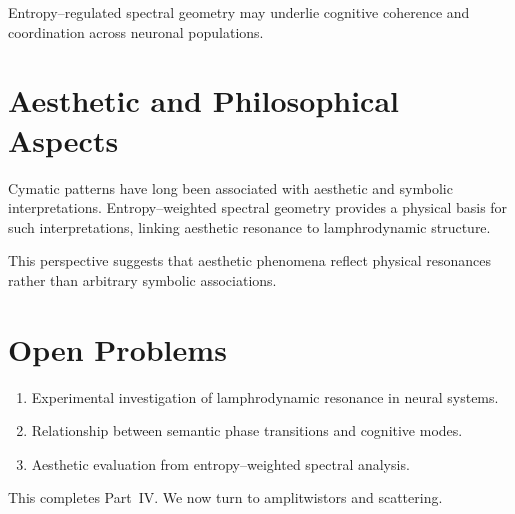 \begin{remark}
Entropy--regulated spectral geometry may underlie cognitive coherence
and coordination across neuronal populations.
\end{remark}


\section{Aesthetic and Philosophical Aspects}

Cymatic patterns have long been associated with aesthetic and symbolic
interpretations. Entropy--weighted spectral geometry provides a physical
basis for such interpretations, linking aesthetic resonance to
lamphrodynamic structure.

\begin{remark}
This perspective suggests that aesthetic phenomena reflect physical
resonances rather than arbitrary symbolic associations.
\end{remark}


\section{Open Problems}

\begin{enumerate}
\item Experimental investigation of lamphrodynamic resonance in neural
systems.
\item Relationship between semantic phase transitions and cognitive
modes.
\item Aesthetic evaluation from entropy--weighted spectral analysis.
\end{enumerate}

\medskip
\noindent
This completes Part~IV. We now turn to amplitwistors and scattering.
\newpage

